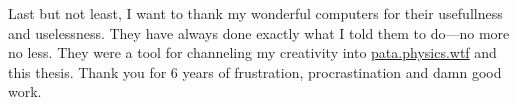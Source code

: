 \spirals

Last but not least, I want to thank my wonderful computers for their usefullness and uselessness. They have always done exactly what I told them to do---no more no less. They were a tool for channeling my creativity into \url{pata.physics.wtf} and this thesis. Thank you for 6 years of frustration, procrastination and damn good work.










\clearpage
